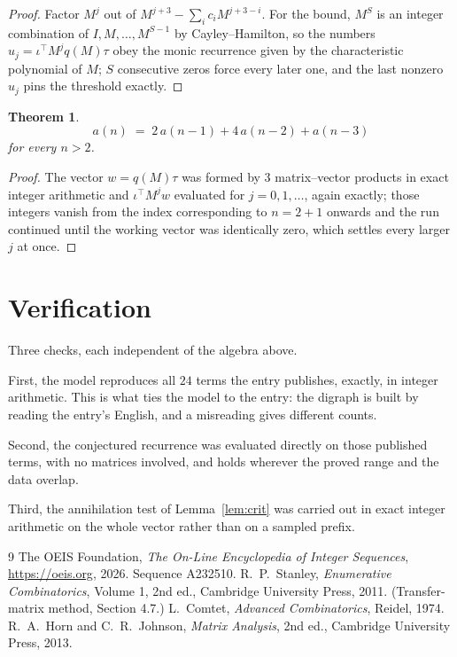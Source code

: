 \documentclass[11pt,a4paper]{article}
\theoremstyle{plain}
\newtheorem{theorem}{Theorem}
\theoremstyle{definition}
\begin{document}
\begin{proof}
Factor $M^{j}$ out of $M^{j+3}-\sum_ic_iM^{j+3-i}$. For the bound, $M^{S}$
is an integer combination of $I,M,\dots,M^{S-1}$ by Cayley--Hamilton, so the numbers
$u_j=\iota^{\!\top}M^{j}q(M)\tau$ obey the monic recurrence given by the characteristic
polynomial of $M$; $S$ consecutive zeros force every later one, and the last nonzero $u_j$
pins the threshold exactly.
\end{proof}

\begin{theorem}
\[
a(n)\;=\;2\,a(n-1) + 4\,a(n-2) + a(n-3)
\]
for every $n>2$.
\end{theorem}

\begin{proof}
The vector $w=q(M)\tau$ was formed by $3$ matrix--vector products in exact integer
arithmetic and $\iota^{\!\top}M^{j}w$ evaluated for $j=0,1,\dots$, again exactly; those
integers vanish from the index corresponding to $n=2+1$ onwards and the run continued
until the working vector was identically zero, which settles every larger $j$ at once.
\end{proof}

\section{Verification}

Three checks, each independent of the algebra above.

First, the model reproduces all $24$ terms the entry publishes, exactly, in integer
arithmetic. This is what ties the model to the entry: the digraph is built by reading the
entry's English, and a misreading gives different counts.

Second, the conjectured recurrence was evaluated directly on those published terms, with no
matrices involved, and holds wherever the proved range and the data overlap.

Third, the annihilation test of Lemma~\ref{lem:crit} was carried out in exact integer
arithmetic on the whole vector rather than on a sampled prefix.

\begin{thebibliography}{9}
 The OEIS Foundation, \emph{The On-Line Encyclopedia of Integer
Sequences}, \url{https://oeis.org}, 2026. Sequence A232510.
 R.~P.~Stanley, \emph{Enumerative Combinatorics}, Volume 1, 2nd ed.,
Cambridge University Press, 2011. (Transfer-matrix method, Section 4.7.)
 L.~Comtet, \emph{Advanced Combinatorics}, Reidel, 1974.
 R.~A.~Horn and C.~R.~Johnson, \emph{Matrix Analysis}, 2nd ed., Cambridge
University Press, 2013.
\end{thebibliography}
\end{document}
